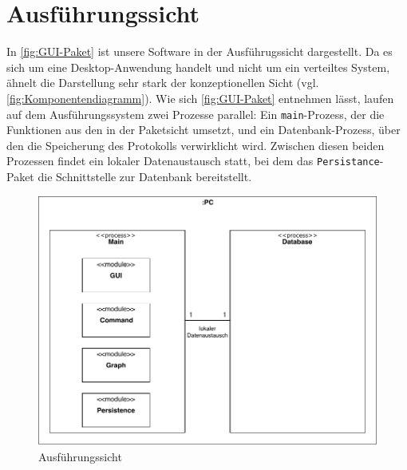 \documentclass[enabledeprecatedfontcommands,fontsize=12pt,paper=a4,twoside,parskip=half]{scrartcl}
\begin{document}
\clearpage

\section{Ausführungssicht}

\label{sec:ausfuehrung}

In \autoref{fig:GUI-Paket} ist unsere Software in der Ausführugssicht dargestellt. Da es sich um eine Desktop-Anwendung handelt und nicht um ein verteiltes System, ähnelt die Darstellung sehr stark der konzeptionellen Sicht (vgl. \autoref{fig:Komponentendiagramm}). Wie sich \autoref{fig:GUI-Paket} entnehmen lässt, laufen auf dem Ausführungssystem zwei Prozesse parallel: Ein \texttt{main}-Prozess, der die Funktionen aus den in der Paketsicht umsetzt, und ein Datenbank-Prozess, über den die Speicherung des Protokolls verwirklicht wird. Zwischen diesen beiden Prozessen findet ein lokaler Datenaustausch statt, bei dem das \texttt{Persistance}-Paket die Schnittstelle zur Datenbank bereitstellt.

\begin{figure}[H]
    \centering
    \includegraphics{Bilder/ausfuehrungssicht.pdf}
    \caption{Ausführungssicht}
    \label{fig:GUI-Paket}
\end{figure}
\end{document}
